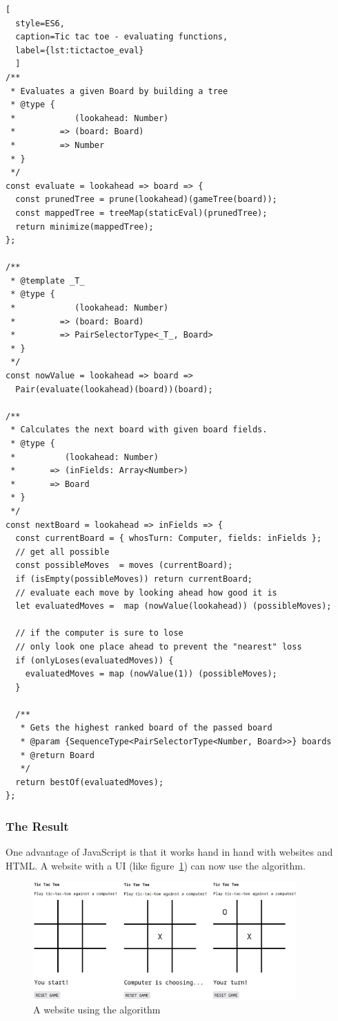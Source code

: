 \begin{lstlisting}[
  style=ES6, 
  caption=Tic tac toe - evaluating functions,
  label={lst:tictactoe_eval}
  ]
/**
 * Evaluates a given Board by building a tree
 * @type {
 *            (lookahead: Number)
 *         => (board: Board)
 *         => Number
 * }
 */
const evaluate = lookahead => board => {
  const prunedTree = prune(lookahead)(gameTree(board));
  const mappedTree = treeMap(staticEval)(prunedTree);
  return minimize(mappedTree);
};

/**
 * @template _T_
 * @type {
 *            (lookahead: Number)
 *         => (board: Board)
 *         => PairSelectorType<_T_, Board>
 * }
 */
const nowValue = lookahead => board =>
  Pair(evaluate(lookahead)(board))(board);

/**
 * Calculates the next board with given board fields.
 * @type {
 *          (lookahead: Number)
 *       => (inFields: Array<Number>)
 *       => Board
 * }
 */
const nextBoard = lookahead => inFields => {
  const currentBoard = { whosTurn: Computer, fields: inFields };
  // get all possible
  const possibleMoves  = moves (currentBoard);
  if (isEmpty(possibleMoves)) return currentBoard;
  // evaluate each move by looking ahead how good it is
  let evaluatedMoves =  map (nowValue(lookahead)) (possibleMoves);

  // if the computer is sure to lose 
  // only look one place ahead to prevent the "nearest" loss
  if (onlyLoses(evaluatedMoves)) {
    evaluatedMoves = map (nowValue(1)) (possibleMoves);
  }

  /**
   * Gets the highest ranked board of the passed board
   * @param {SequenceType<PairSelectorType<Number, Board>>} boards
   * @return Board
   */
  return bestOf(evaluatedMoves);
};
\end{lstlisting}

\subsubsection{The Result} %
\label{sec:ttt_result}
One advantage of JavaScript is that it works hand in hand with websites and
HTML. A website with a UI (like figure~\ref{img:ttt_playfield}) can now use the
algorithm.\\

\begin{figure}[H]
    \centering
    \includegraphics[width=0.9\textwidth]{./mainmatter/pictures/tic-tac-toe-field.png}
    \caption{A website using the algorithm}
    \label{img:ttt_playfield}
\end{figure}

